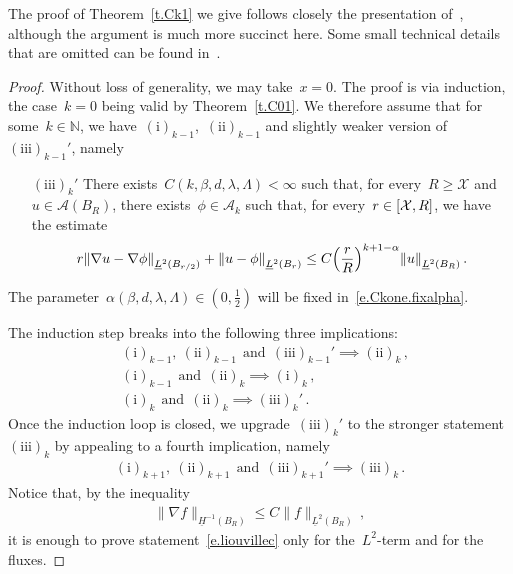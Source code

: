 \documentclass[11pt,twoside]{article} %
\numberwithin{equation}{section}
\theoremstyle{definition}
\let\originalleft\left
\let\originalright\right
\renewcommand{\left}{\mathopen{}\mathclose\bgroup\originalleft}
\renewcommand{\right}{\aftergroup\egroup\originalright}
\newcommand*{\N}{\ensuremath{\mathbb{N}}}
\newcommand*{\Rd}{\ensuremath{\mathbb{R}^d}}
\newcommand{\X}{\mathcal{X}}
\newcommand{\A}{\mathcal{A}}
\begin{document}
The proof of Theorem~\ref{t.Ck1} we give follows closely the presentation of~\cite[Proof of Theorem 3.8]{AKMBook}, although the argument is much more succinct here. Some small technical details that are omitted can be found in~\cite{AKMBook}.

\begin{proof} 
Without loss of generality, we may take~$x=0$. The proof is via induction, the case~$k=0$ being valid by Theorem~\ref{t.C01}. We therefore assume that for some~$k\in\N$, we have~$\mathrm{(i)}_{k-1}$,~$\mathrm{(ii)}_{k-1}$ and slightly weaker version of~$\mathrm{(iii)}_{k-1}'$, namely
\begin{enumerate}
\item[{$\mathrm{(iii)}_k'$}]
There exists~$C(k,\beta,d,\lambda,\Lambda)<\infty$ such that, for every~$R\geq \X$ and~$u\in \A(B_R)$, there exists~$\phi \in \A_k$ such that, for every~$r \in \left[ \X, R \right]$, we have the estimate
\begin{equation}
\label{e.intrinsicreg.prime}
r \left\| \nabla u - \nabla \phi \right\|_{\underline{L}^2(B_{r/2})}  
+ 
\left\| u - \phi \right\|_{\underline{L}^2(B_r)} 
\leq 
C \left( \frac r R \right)^{k+1-\alpha} %
\left\| u \right\|_{\underline{L}^2(B_R)} \, .
\end{equation}
\end{enumerate}
The parameter~$\alpha(\beta,d,\lambda,\Lambda) \in (0,\frac12)$ will be fixed in~\eqref{e.Ckone.fixalpha}.  

\smallskip

The induction step breaks into the following three implications:
\begin{align}   
\label{e.ind1}
& \mathrm{(i)}_{k-1}, \ \mathrm{(ii)}_{k-1} \ \ \text{and} \ \ \mathrm{(iii)}_{k-1}'  \implies \mathrm{(ii)}_{k}
\,,
\\ 
\label{e.ind2}
& \mathrm{(i)}_{k-1} \ \ \text{and} \ \ \mathrm{(ii)}_{k}   \implies \mathrm{(i)}_{k}
\,, \\ 
\label{e.ind3}
& \mathrm{(i)}_{k}\ \ \text{and} \ \ \mathrm{(ii)}_{k}  \implies \mathrm{(iii)}_{k}'
\,.
\end{align}
Once the induction loop is closed, we upgrade~$\mathrm{(iii)}_{k}'$ to the stronger statement~$\mathrm{(iii)}_{k}$ by appealing to a fourth implication, namely 
\begin{align}
\label{e.ind4}
\mathrm{(i)}_{k+1}, \ \mathrm{(ii)}_{k+1} \ \ \text{and} \ \ \mathrm{(iii)}_{k+1}'  \implies \mathrm{(iii)}_{k}
\,.
\end{align}
Notice that, by the inequality 
\begin{align*}  
\| \nabla f \|_{\underline{H}^{-1}(B_R)} \leq C  \|  f \|_{\underline{L}^{2}(B_R)} 
\,,
\end{align*}
it is enough to prove statement~\eqref{e.liouvillec} only for the~$L^2$-term and for the fluxes. 


\end{proof}
\end{document}
